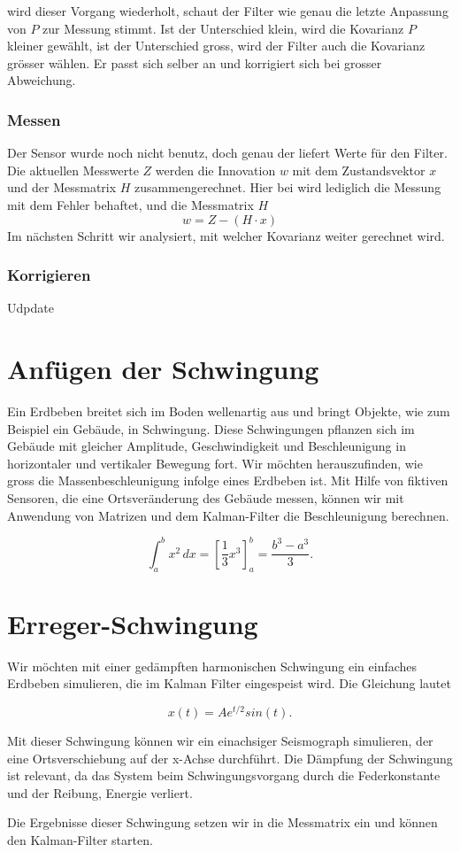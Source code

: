 \documentclass[11pt,a4paper]{article}
\begin{document}
wird dieser Vorgang wiederholt, schaut der Filter wie genau die letzte Anpassung von $P$ zur Messung stimmt. Ist der Unterschied klein, wird die Kovarianz $P$ kleiner gewählt, ist der Unterschied gross, wird der Filter auch die Kovarianz grösser wählen. Er passt sich selber an und korrigiert sich bei grosser Abweichung.

\subsubsection*{Messen}
Der Sensor wurde noch nicht benutz, doch genau der liefert Werte für den Filter. Die aktuellen Messwerte $Z$ werden die Innovation $w$ mit dem Zustandsvektor $x$ und der Messmatrix $H$ zusammengerechnet.
Hier bei wird lediglich die Messung mit dem Fehler behaftet, und die Messmatrix $H$ 
\begin{equation}
w=Z-(H\cdot x)
\end{equation}
Im nächsten Schritt wir analysiert, mit welcher Kovarianz weiter gerechnet wird. 

\subsubsection*{Korrigieren}
Udpdate
\section{Anfügen der Schwingung}

Ein Erdbeben breitet sich im Boden wellenartig aus und bringt Objekte, wie zum Beispiel ein Gebäude, in Schwingung.
Diese Schwingungen pflanzen sich im Gebäude mit gleicher Amplitude, Geschwindigkeit und Beschleunigung in horizontaler und vertikaler Bewegung fort.
Wir möchten herauszufinden, wie gross die Massenbeschleunigung infolge eines Erdbeben ist.
Mit Hilfe von fiktiven Sensoren, die eine Ortsveränderung des Gebäude messen, können wir mit Anwendung von Matrizen und dem Kalman-Filter die Beschleunigung berechnen.

\begin{equation}
\int_a^b x^2\, dx
=
\left[ \frac13 x^3 \right]_a^b
=
\frac{b^3-a^3}3.
\label{erdbeben:equation1}
\end{equation}

\section{Erreger-Schwingung}
Wir möchten mit einer gedämpften harmonischen Schwingung ein einfaches Erdbeben simulieren, die im Kalman Filter eingespeist wird.
Die Gleichung lautet

\begin{equation}
x(t)=Ae^{t/2}sin(t).
\end{equation}

Mit dieser Schwingung können wir ein einachsiger Seismograph simulieren, der eine Ortsverschiebung auf der x-Achse durchführt.
Die Dämpfung der Schwingung ist relevant, da das System beim Schwingungsvorgang durch die Federkonstante und der Reibung, Energie verliert.

Die Ergebnisse dieser Schwingung setzen wir in die Messmatrix ein und können den Kalman-Filter starten.
\end{document}
